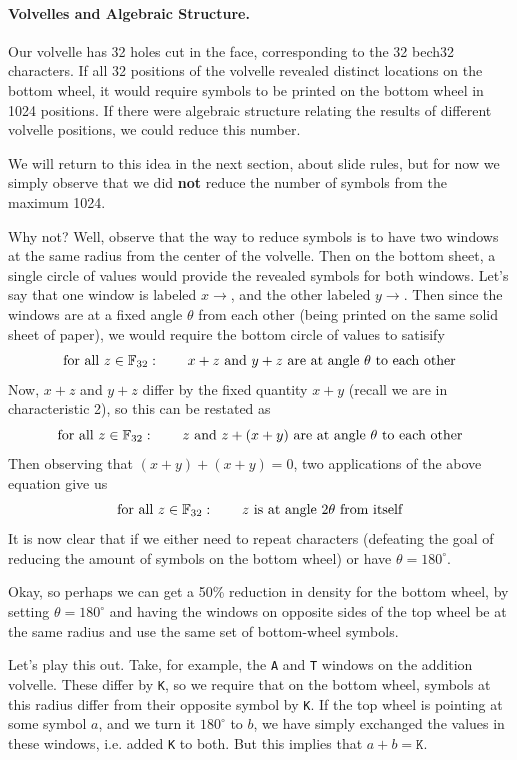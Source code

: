 \documentclass[letterpaper]{article}
\theoremstyle{xxx}
\theoremstyle{evil}
\theoremstyle{yyy}
\theoremstyle{plain}
\theoremstyle{zzz}
\newcommand{\fttwo}{\mathbb{F}_{32}}
\newcommand{\vc}[1]{\texttt{#1}} %
\begin{document}
\paragraph{Volvelles and Algebraic Structure.} Our volvelle has 32 holes cut
in the face, corresponding to the 32 bech32 characters. If all 32 positions
of the volvelle revealed distinct locations on the bottom wheel, it would
require symbols to be printed on the bottom wheel in 1024 positions. If there
were algebraic structure relating the results of different volvelle positions,
we could reduce this number.

We will return to this idea in the next section, about slide rules, but for now
we simply observe that we did \textbf{not} reduce the number of symbols from
the maximum 1024.

Why not? Well, observe that the way to reduce symbols is to have two windows at
the same radius from the center of the volvelle. Then on the bottom sheet, a
single circle of values would provide the revealed symbols for both windows.
Let's say that one window is labeled $x\to$, and the other labeled $y\to$. Then
since the windows are at a fixed angle $\theta$ from each other (being printed
on the same solid sheet of paper), we would require the bottom circle of values
to satisify
\[ \textnormal{for all } z\in\fttwo:\qquad x + z \textnormal{ and } y+z \textnormal{ are at angle $\theta$ to each other} \]
Now, $x+z$ and $y+z$ differ by the fixed quantity $x+y$ (recall we are in
characteristic 2), so this can be restated as
\[ \textnormal{for all } z\in\fttwo:\qquad z \textnormal{ and } z+(x+y) \textnormal{ are at angle $\theta$ to each other} \]
Then observing that $(x+y) + (x+y) = 0$, two applications of the above equation
give us
\[ \textnormal{for all } z\in\fttwo:\qquad z \textnormal{ is at angle $2\theta$ from itself} \]
It is now clear that if we either need to repeat characters (defeating the goal
of reducing the amount of symbols on the bottom wheel) or have $\theta=180^\circ$.

Okay, so perhaps we can get a 50\% reduction in density for the bottom wheel, by
setting $\theta=180^\circ$ and having the windows on opposite sides of the top
wheel be at the same radius and use the same set of bottom-wheel symbols.

Let's play this out. Take, for example, the \vc{A} and \vc{T} windows on the
addition volvelle. These differ by \vc{K}, so we require that on the bottom
wheel, symbols at this radius differ from their opposite symbol by \vc{K}.
If the top wheel is pointing at some symbol $a$, and we turn it $180^\circ$
to $b$, we have simply exchanged the values in these windows, i.e. added
\vc{K} to both. But this implies that $a+b=\vc{K}$.
\end{document}
